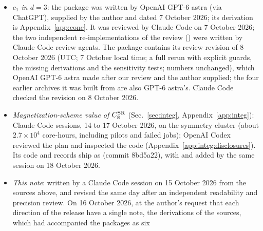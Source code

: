 \documentclass[11pt,a4paper]{article}
\numberwithin{equation}{section}
\newcommand{\CSR}{C^{\rm SR}}
\newcommand{\file}[1]{\path{#1}}
\newcommand{\sci}[2]{#1\times10^{#2}}
\begin{document}
\begin{itemize}
 elliptic and local checks (with the integer-interval certificate of the closed expression), and the two Hamiltonian
 packages (the solver). Its 17 archived raw records ($N=128$ to 384) were computed by GPT-6 astra in its own
 environment; their machine, dates and software versions are not recorded. Eleven of them are points of the
 continuum analysis (nine of the 23 in its joint fit; Sec.~\ref{sec:cyl}), with their auxiliary sums recomputed on the
 symmetry cluster. Claude Code sessions wrote the cluster
 layer for SDSC Expanse and the symmetry cluster, ran the production and wrote the arbitrary-$N$ continuum analysis.
 OpenAI Codex reviewed the analysis plan in seven rounds, approving it at revision 7, and inspected the cluster layer
 and the analysis code twice each. The fixes made after the last inspection of each were not re-inspected (for the
 analysis, four hardening findings with no numerical change, by the author's choice).
\item \emph{$c_1$ in $d=3$}: the package was written by OpenAI GPT-6 astra (via ChatGPT), supplied by the author and
 dated 7 October 2026; its derivation is Appendix~\ref{app:cone}. It was reviewed by Claude Code on 7 October 2026; the two independent re-implementations of the
 review (\file{review_indep/}) were written by Claude Code review agents. The package contains its review revision of
 8 October 2026 (UTC; 7 October local time; a full rerun with explicit guards, the missing derivations and the sensitivity tests; numbers
 unchanged), which OpenAI GPT-6 astra made after our review and the author supplied; the four earlier archives it was
 built from are also GPT-6 astra's. Claude Code checked the revision on 8 October 2026.
\item \emph{Magnetization-scheme value of $\CSR_8$} (Sec.~\ref{sec:integ}, Appendix~\ref{app:integ}): Claude Code
 sessions, 14 to 17 October 2026, on the symmetry cluster (about $\sci{2.7}{4}$ core-hours, including pilots and failed jobs); OpenAI Codex reviewed the
 plan and inspected the code (Appendix~\ref{app:integ:disclosures}). Its code and records ship as
 \file{code/integ_d1/} (commit 8bd5a22), with \file{public.mk} and \file{public/} added by the same session on 18 October
 2026.
\item \emph{This note}: written by a Claude Code session on 15 October 2026 from the sources above, and revised the
 same day after an independent readability and precision review. On 16 October 2026, at the author's request that each
 direction of the release have a single note, the derivations of the sources, which had accompanied the packages as six

\end{itemize}
\end{document}
